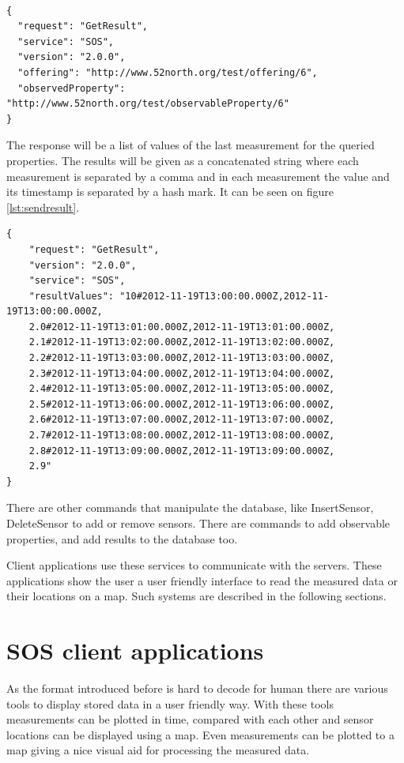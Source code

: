 \begin{lstlisting}[caption={JSON minimal GetResult POST request\label{lst:getresult}}]

{
  "request": "GetResult",
  "service": "SOS",
  "version": "2.0.0",
  "offering": "http://www.52north.org/test/offering/6",
  "observedProperty": "http://www.52north.org/test/observableProperty/6"
}
\end{lstlisting}

The response will be a list of values of the last measurement for the queried properties. The results will be given as a concatenated string where each measurement is separated by a comma and in each measurement the value and its timestamp is separated by a hash mark. It can be seen on figure \ref{lst:sendresult}.

\begin{lstlisting}[caption={JSON GetResult response\label{lst:sendresult}}]
{
    "request": "GetResult",
    "version": "2.0.0",
    "service": "SOS",
    "resultValues": "10#2012-11-19T13:00:00.000Z,2012-11-19T13:00:00.000Z,
    2.0#2012-11-19T13:01:00.000Z,2012-11-19T13:01:00.000Z,
    2.1#2012-11-19T13:02:00.000Z,2012-11-19T13:02:00.000Z,
    2.2#2012-11-19T13:03:00.000Z,2012-11-19T13:03:00.000Z,
    2.3#2012-11-19T13:04:00.000Z,2012-11-19T13:04:00.000Z,
    2.4#2012-11-19T13:05:00.000Z,2012-11-19T13:05:00.000Z,
    2.5#2012-11-19T13:06:00.000Z,2012-11-19T13:06:00.000Z,
    2.6#2012-11-19T13:07:00.000Z,2012-11-19T13:07:00.000Z,
    2.7#2012-11-19T13:08:00.000Z,2012-11-19T13:08:00.000Z,
    2.8#2012-11-19T13:09:00.000Z,2012-11-19T13:09:00.000Z,
    2.9"
}
\end{lstlisting}

There are other commands that manipulate the database, like InsertSensor, DeleteSensor to add or remove sensors. There are commands to add observable properties, and add results to the database too. 

Client applications use these services to communicate with the servers. These applications show the user a user friendly interface to read the measured data or their locations on a map. Such systems are described in the following sections.

\section{SOS client applications}

As the format introduced before is hard to decode for human there are various tools to display stored data in a user friendly way. With these tools measurements can be plotted in time, compared with each other and sensor locations can be displayed using a map. Even measurements can be plotted to a map giving a nice visual aid for processing the measured data. 

